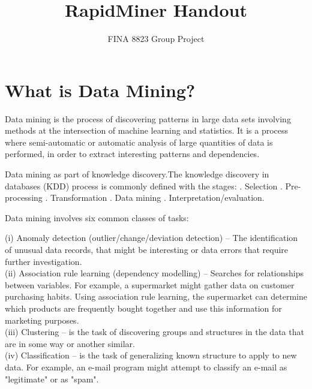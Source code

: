 \documentclass[12pt]{article}
\title{RapidMiner Handout}
\author{FINA 8823 Group Project}
\begin{document}
\maketitle

\tableofcontents

\newpage

\section{What is Data Mining?}

Data mining is the process of discovering patterns in large data sets involving methods at the intersection of machine learning and statistics. It is a process where semi-automatic or automatic analysis of large quantities of data is performed, in order to extract interesting patterns and dependencies. \newline

Data mining as part of knowledge discovery.The knowledge discovery in databases (KDD) process is commonly defined with the stages: .	Selection .	Pre-processing .	Transformation .	Data mining .	Interpretation/evaluation.\newline

Data mining involves six common classes of tasks:

(i) Anomaly detection (outlier/change/deviation detection) – The identification of unusual data records, that might be interesting or data errors that require further investigation. \\

(ii) Association rule learning (dependency modelling) – Searches for relationships between variables. For example, a supermarket might gather data on customer purchasing habits. Using association rule learning, the supermarket can determine which products are frequently bought together and use this information for marketing purposes. \\

(iii) Clustering – is the task of discovering groups and structures in the data that are in some way or another similar. \\

(iv) Classification – is the task of generalizing known structure to apply to new data. For example, an e-mail program might attempt to classify an e-mail as "legitimate" or as "spam". \\
\end{document}
